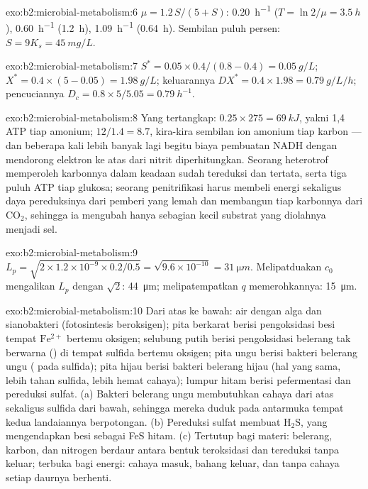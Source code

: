 \begin{solution}{exo:b2:microbial-metabolism:6}
$\mu = 1.2\,S/(5 + S)$: \qty{0.20}{h^{-1}} ($T = \ln 2/\mu =
\qty{3.5}{h}$), \qty{0.60}{h^{-1}} (\qty{1.2}{h}), \qty{1.09}{h^{-1}}
(\qty{0.64}{h}). Sembilan puluh persen: $S = 9K_s = \qty{45}{mg/L}$.
\end{solution}

\begin{solution}{exo:b2:microbial-metabolism:7}
$S^* = 0.05\times 0.4/(0.8 - 0.4) = \qty{0.05}{g/L}$; $X^* =
0.4\times(5 - 0.05) = \qty{1.98}{g/L}$; keluarannya $DX^* = 0.4\times
1.98 = \qty{0.79}{g/L/h}$; pencuciannya $D_c = 0.8\times 5/5.05 =
\qty{0.79}{h^{-1}}$.
\end{solution}

\begin{solution}{exo:b2:microbial-metabolism:8}
Yang tertangkap: $0.25\times 275 = \qty{69}{kJ}$, yakni 1,4 ATP tiap
amonium; $12/1.4 = 8.7$, kira-kira sembilan ion amonium tiap karbon ---
dan beberapa kali lebih banyak lagi begitu biaya pembuatan NADH dengan
mendorong elektron ke atas dari nitrit diperhitungkan. Seorang
heterotrof memperoleh karbonnya dalam keadaan sudah tereduksi dan
tertata, serta tiga puluh ATP tiap glukosa; seorang penitrifikasi harus
membeli energi sekaligus daya pereduksinya dari pemberi yang lemah dan
membangun tiap karbonnya dari $\mathrm{CO_2}$, sehingga ia mengubah
hanya sebagian kecil substrat yang diolahnya menjadi sel.
\end{solution}

\begin{solution}{exo:b2:microbial-metabolism:9}
$L_p = \sqrt{2\times 1.2\times 10^{-9}\times 0.2/0.5} =
\sqrt{9.6\times 10^{-10}} = \qty{31}{\micro m}$. Melipatduakan $c_0$
mengalikan $L_p$ dengan $\sqrt 2$: \qty{44}{\micro m}; melipatempatkan
$q$ memerohkannya: \qty{15}{\micro m}.
\end{solution}

\begin{solution}{exo:b2:microbial-metabolism:10}
Dari atas ke bawah: air dengan alga dan sianobakteri (fotosintesis
beroksigen); pita berkarat berisi pengoksidasi besi tempat
$\mathrm{Fe^{2+}}$ bertemu oksigen; selubung putih berisi
pengoksidasi belerang tak berwarna () di tempat sulfida
bertemu oksigen; pita ungu berisi bakteri belerang ungu ( pada
sulfida); pita hijau berisi bakteri belerang hijau (hal yang sama,
lebih tahan sulfida, lebih hemat cahaya); lumpur hitam berisi
pefermentasi dan pereduksi sulfat. (a) Bakteri belerang ungu
membutuhkan cahaya dari atas sekaligus sulfida dari bawah, sehingga
mereka duduk pada antarmuka tempat kedua landaiannya berpotongan.
(b) Pereduksi sulfat membuat $\mathrm{H_2S}$, yang mengendapkan besi
sebagai FeS hitam. (c) Tertutup bagi materi: belerang, karbon, dan
nitrogen berdaur antara bentuk teroksidasi dan tereduksi tanpa keluar;
terbuka bagi energi: cahaya masuk, bahang keluar, dan tanpa cahaya
setiap daurnya berhenti.
\end{solution}

